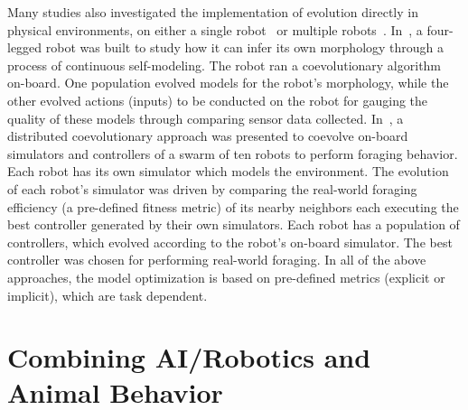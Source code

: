 Many studies also investigated the implementation of evolution directly in physical environments, on either a single robot~\cite{ Bongard-etal2006:science, Koos2013, Cully2015} or multiple robots~\cite{Alan2014}. In~\cite{Bongard-etal2006:science}, a four-legged robot was built to study how it can infer its own morphology through a process of continuous self-modeling. The robot ran a coevolutionary algorithm on-board. One population evolved models for the robot's morphology, while the other evolved actions (inputs) to be conducted on the robot for gauging the quality of these models through comparing sensor data collected. In~\cite{Alan2014}, a distributed coevolutionary approach was presented to coevolve on-board simulators and controllers of a swarm of ten robots to perform foraging behavior. Each robot has its own simulator which models the environment. The evolution of each robot's simulator was driven by comparing the real-world foraging efficiency (a pre-defined fitness metric) of its nearby neighbors each executing the best controller generated by their own simulators. Each robot has a population of controllers, which evolved according to the robot's on-board simulator. The best controller was chosen for performing real-world foraging. In all of the above approaches, the model optimization is based on pre-defined metrics (explicit or implicit), which are task dependent.


\section{Combining AI/Robotics and Animal Behavior}\label{sec:combine_AI_robotics_animal_behavior}

